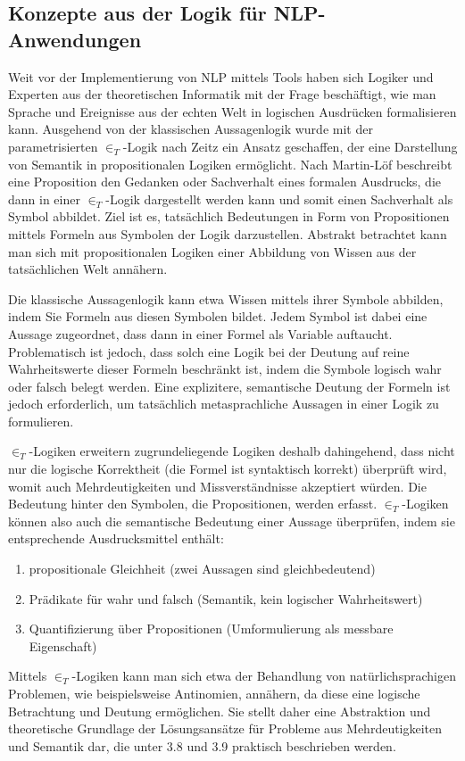 \documentclass[12pt]{report}
\begin{document}
\subsection{Konzepte aus der Logik für NLP-Anwendungen}
Weit vor der Implementierung von NLP mittels Tools haben sich Logiker und Experten aus der theoretischen Informatik mit der Frage beschäftigt, wie man Sprache und Ereignisse aus der echten Welt in logischen Ausdrücken formalisieren kann. Ausgehend von der klassischen Aussagenlogik wurde mit der parametrisierten $\in_T$-Logik nach Zeitz \cite{ze00} ein Ansatz geschaffen, der eine Darstellung von Semantik in propositionalen Logiken ermöglicht. Nach Martin-Löf \cite{ml96} beschreibt eine Proposition den \glqq  Gedanken oder Sachverhalt eines formalen Ausdrucks\grqq{}, die dann in einer $\in_T$-Logik dargestellt werden kann und somit einen Sachverhalt als Symbol abbildet. Ziel ist es, tatsächlich Bedeutungen in Form von Propositionen mittels Formeln aus Symbolen der Logik darzustellen. Abstrakt betrachtet kann man sich mit propositionalen Logiken einer Abbildung von Wissen aus der tatsächlichen Welt annähern. 

Die klassische Aussagenlogik kann etwa Wissen mittels ihrer Symbole abbilden, indem Sie Formeln aus diesen Symbolen bildet. Jedem Symbol ist dabei eine Aussage zugeordnet, dass dann in einer Formel als Variable auftaucht. Problematisch ist jedoch, dass solch eine Logik bei der Deutung auf reine Wahrheitswerte dieser Formeln beschränkt ist, indem die Symbole logisch wahr oder falsch belegt werden. Eine explizitere, semantische Deutung der Formeln ist jedoch erforderlich, um tatsächlich metasprachliche Aussagen in einer Logik zu formulieren. 

$\in_T$-Logiken erweitern zugrundeliegende Logiken deshalb dahingehend, dass nicht nur die logische Korrektheit (die Formel ist syntaktisch korrekt) überprüft wird, womit auch Mehrdeutigkeiten und Missverständnisse akzeptiert würden. Die Bedeutung hinter den Symbolen, die Propositionen, werden erfasst. $\in_T$-Logiken können also auch die semantische Bedeutung einer Aussage überprüfen, indem sie entsprechende Ausdrucksmittel enthält:
\begin{enumerate}
\item propositionale Gleichheit (zwei Aussagen sind gleichbedeutend)
\item Prädikate für wahr und falsch (Semantik, kein logischer Wahrheitswert)
\item Quantifizierung über Propositionen (Umformulierung als messbare Eigenschaft)
\end{enumerate}
Mittels $\in_T$-Logiken kann man sich etwa der Behandlung von natürlichsprachigen Problemen, wie beispielsweise Antinomien, annähern, da diese eine logische Betrachtung und Deutung ermöglichen. Sie stellt daher eine Abstraktion und theoretische Grundlage der Lösungsansätze für Probleme aus Mehrdeutigkeiten und Semantik dar, die unter 3.8 und 3.9 praktisch beschrieben werden.
\end{document}

